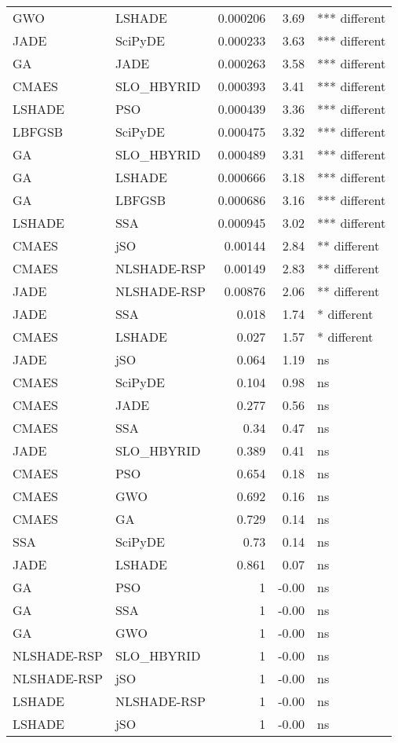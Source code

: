 \begin{table}[t]
\begin{tabular}{l l r r l}
GWO & LSHADE & 0.000206 & 3.69 & *** different\\
JADE & SciPyDE & 0.000233 & 3.63 & *** different\\
GA & JADE & 0.000263 & 3.58 & *** different\\
CMAES & SLO_HBYRID & 0.000393 & 3.41 & *** different\\
LSHADE & PSO & 0.000439 & 3.36 & *** different\\
LBFGSB & SciPyDE & 0.000475 & 3.32 & *** different\\
GA & SLO_HBYRID & 0.000489 & 3.31 & *** different\\
GA & LSHADE & 0.000666 & 3.18 & *** different\\
GA & LBFGSB & 0.000686 & 3.16 & *** different\\
LSHADE & SSA & 0.000945 & 3.02 & *** different\\
CMAES & jSO & 0.00144 & 2.84 & ** different\\
CMAES & NLSHADE-RSP & 0.00149 & 2.83 & ** different\\
JADE & NLSHADE-RSP & 0.00876 & 2.06 & ** different\\
JADE & SSA & 0.018 & 1.74 & * different\\
CMAES & LSHADE & 0.027 & 1.57 & * different\\
JADE & jSO & 0.064 & 1.19 &  ns\\
CMAES & SciPyDE & 0.104 & 0.98 &  ns\\
CMAES & JADE & 0.277 & 0.56 &  ns\\
CMAES & SSA & 0.34 & 0.47 &  ns\\
JADE & SLO_HBYRID & 0.389 & 0.41 &  ns\\
CMAES & PSO & 0.654 & 0.18 &  ns\\
CMAES & GWO & 0.692 & 0.16 &  ns\\
CMAES & GA & 0.729 & 0.14 &  ns\\
SSA & SciPyDE & 0.73 & 0.14 &  ns\\
JADE & LSHADE & 0.861 & 0.07 &  ns\\
GA & PSO & 1 & -0.00 &  ns\\
GA & SSA & 1 & -0.00 &  ns\\
GA & GWO & 1 & -0.00 &  ns\\
NLSHADE-RSP & SLO_HBYRID & 1 & -0.00 &  ns\\
NLSHADE-RSP & jSO & 1 & -0.00 &  ns\\
LSHADE & NLSHADE-RSP & 1 & -0.00 &  ns\\
LSHADE & jSO & 1 & -0.00 &  ns\\

\end{tabular}
\end{table}

